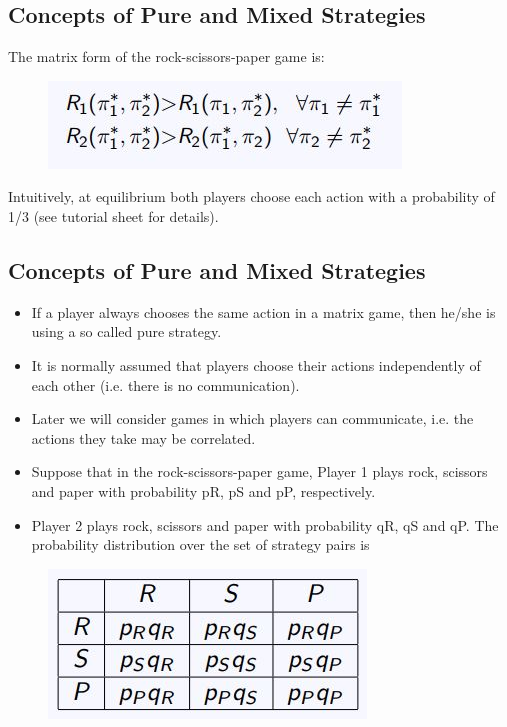 \documentclass[]{report}
\begin{document}
\subsection{Concepts of Pure and Mixed Strategies}
The matrix form of the rock-scissors-paper game is:
\begin{figure}[h!]
\centering
\includegraphics[width=0.7\linewidth]{images/DR7-Slide41}
\caption{}
\label{fig:DR7-Slide41}
\end{figure}

Intuitively, at equilibrium both players choose each action with a
probability of 1/3 (see tutorial sheet for details).

\subsection{Concepts of Pure and Mixed Strategies}
\begin{itemize}
	\item If a player always chooses the same action in a matrix game, then
	he/she is using a so called pure strategy.
	\item It is normally assumed that players choose their actions
	independently of each other (i.e. there is no communication).
	\item Later we will consider games in which players can communicate,
	i.e. the actions they take may be correlated.
\end{itemize}


\begin{itemize}
	\item Suppose that in the rock-scissors-paper game, Player 1 plays rock,
	scissors and paper with probability pR, pS and pP, respectively.
\item Player 2 plays rock, scissors and paper with probability qR, qS and
	qP. The probability distribution over the set of strategy pairs is
\end{itemize}

\begin{figure}[h!]
\centering
\includegraphics[width=0.5\linewidth]{images/DR5-Slide44}
\caption{}
\label{fig:DR5-Slide44}
\end{figure}
\end{document}
